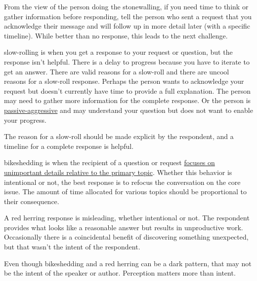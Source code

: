 From the view of the person doing the stonewalling, if you need time to think or gather information before responding, 
tell the person who sent a request that you acknowledge their message and will follow up in more detail later (with a specific timeline). While better than no response, this leads to the next challenge.

\Gls{slow-rolling}
is when you get a response to your request or question, but the response isn't helpful. There is a delay to progress because you have to iterate to get an answer. There are valid reasons for a slow-roll and there are uncool reasons for a slow-roll response. Perhaps the person wants to acknowledge your request but doesn't currently have time to provide a full explanation. The person may need to gather more information for the complete response. Or the person is \href{https://en.wikipedia.org/wiki/Passive-aggressive_behavior}{passive-aggressive}
and may understand your question but does not want to enable your progress. 

The reason for a slow-roll should be made explicit by the respondent, 
and a timeline for a complete response is helpful. 


\Gls{bikeshedding} 
is when the recipient of a question or request \href{https://en.wikipedia.org/wiki/Law_of_triviality}{focuses on unimportant details relative to the primary topic}. 
Whether this behavior is intentional or not, the best response is to refocus the conversation on the core issue. The amount of time allocated for various topics should be proportional to their consequence. 

A \gls{red herring}
response is misleading, whether intentional or not. The respondent provides what looks like a reasonable answer but results in unproductive work. Occasionally there is a coincidental benefit of discovering something unexpected, but that wasn't the intent of the respondent. 


Even though bikeshedding and a red herring can be a dark pattern, that may not be the intent of the speaker or author. Perception matters more than intent.
